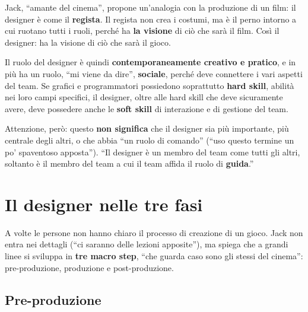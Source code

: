 Jack, ``amante del cinema'', propone un'analogia con la produzione di un
film: il designer è come il \textbf{regista}. Il regista non crea i costumi,
ma è il perno intorno a cui ruotano tutti i ruoli, perché ha \textbf{la
visione} di ciò che sarà il film. Così il designer: ha la visione di ciò che
sarà il gioco.

Il ruolo del designer è quindi \textbf{contemporaneamente creativo e
pratico}, e in più ha un ruolo, ``mi viene da dire'', \textbf{sociale},
perché deve connettere i vari aspetti del team. Se grafici e programmatori
possiedono soprattutto \textbf{hard skill}, abilità nei loro campi
specifici, il designer, oltre alle hard skill che deve sicuramente avere,
deve possedere anche le \textbf{soft skill} di interazione e di gestione del
team.

Attenzione, però: questo \textbf{non significa} che il designer sia più
importante, più centrale degli altri, o che abbia ``un ruolo di
comando'' (``uso questo termine un po' spaventoso apposta''). ``Il designer è
un membro del team come tutti gli altri, soltanto è il membro del team a
cui il team affida il ruolo di \textbf{guida}.''

\section{Il designer nelle tre fasi}
\label{p2:sec:fasi}

A volte le persone non hanno chiaro il processo di creazione di un gioco.
Jack non entra nei dettagli (``ci saranno delle lezioni apposite''), ma
spiega che a grandi linee si sviluppa in \textbf{tre macro step}, ``che
guarda caso sono gli stessi del cinema'': pre-produzione, produzione e
post-produzione.

\subsection{Pre-produzione}

